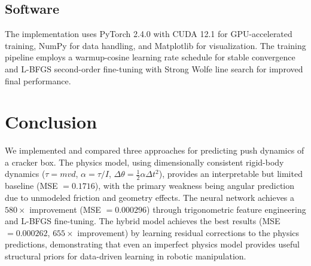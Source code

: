 \documentclass[a4paper]{article}
\begin{document}
\subsection{Software}

The implementation uses PyTorch 2.4.0 with CUDA 12.1 for GPU-accelerated training, NumPy for data handling, and Matplotlib for visualization. The training pipeline employs a warmup-cosine learning rate schedule for stable convergence and L-BFGS second-order fine-tuning with Strong Wolfe line search for improved final performance.


\section{Conclusion}

We implemented and compared three approaches for predicting push dynamics of a cracker box. The physics model, using dimensionally consistent rigid-body dynamics ($\tau = mvd$, $\alpha = \tau/I$, $\Delta\theta = \frac{1}{2}\alpha\Delta t^2$), provides an interpretable but limited baseline (MSE $= 0.1716$), with the primary weakness being angular prediction due to unmodeled friction and geometry effects. The neural network achieves a $580\times$ improvement (MSE $= 0.000296$) through trigonometric feature engineering and L-BFGS fine-tuning. The hybrid model achieves the best results (MSE $= 0.000262$, $655\times$ improvement) by learning residual corrections to the physics predictions, demonstrating that even an imperfect physics model provides useful structural priors for data-driven learning in robotic manipulation.
\end{document}
